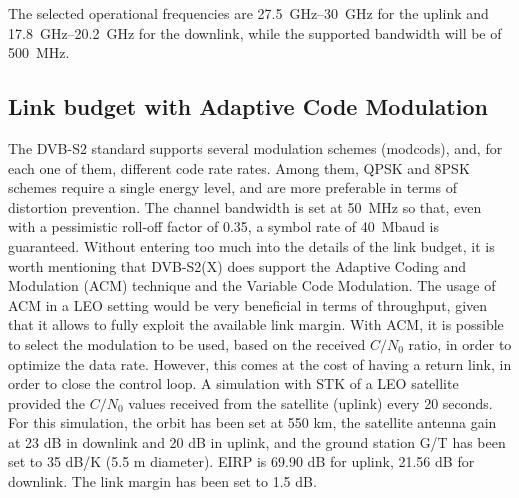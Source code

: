\documentclass[conference,10pt,a4paper]{IEEEtran}%
\begin{document}
The selected operational frequencies are \SIrange{27.5}{30}{\GHz} for the uplink and  \SIrange{17.8}{20.2}{\GHz} for the downlink, while the supported bandwidth will be of \SI{500}{\MHz}.


\subsection{Link budget with Adaptive Code Modulation}
The DVB-S2 standard supports several modulation schemes (modcods), and, for each one of them, different code rate rates.
Among them, QPSK and 8PSK schemes require a single energy level, and are more preferable in terms of distortion prevention.
The channel bandwidth is set at \SI{50}{\MHz} so that, even with a pessimistic roll-off factor of \num{0.35}, a symbol rate of 40~Mbaud is guaranteed.
Without entering too much into the details of the link budget, it is worth mentioning that DVB-S2(X) does support the Adaptive Coding and Modulation (ACM) technique and the Variable Code Modulation.
The usage of ACM in a LEO setting would be very beneficial in terms of throughput, given that it allows to fully exploit the available link margin.
With ACM, it is possible to select the modulation to be used, based on the received $C/N_0$ ratio, in order to optimize the data rate.
However, this comes at the cost of having a return link, in order to close the control loop.
A simulation with STK of a LEO satellite provided the $C/N_0$ values received from the satellite (uplink) every 20 seconds.
For this simulation, the orbit has been set at 550 km, the satellite antenna gain at 23 dB in downlink and 20 dB in uplink, and the ground station G/T has been set to 35 dB/K (5.5 m diameter).
EIRP is 69.90 dB for uplink, 21.56 dB for downlink.
The link margin has been set to 1.5 dB.
\end{document}
